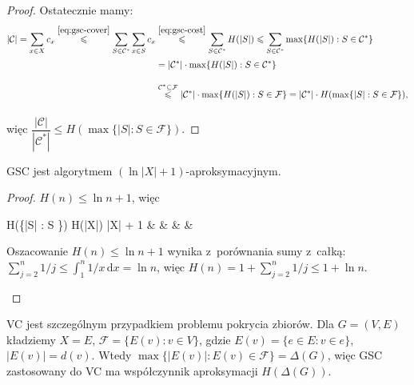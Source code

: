 \begin{obowiazkowy}
\begin{proof}
		Ostatecznie mamy:
		\begin{align*}
			|\mathcal{C}| = \sum_{x \in X} c_x \overset{\eqref{eq:gsc-cover}}{\leq} \sum_{S \in \mathcal{C}^*} \sum_{x \in S} c_x & \overset{\eqref{eq:gsc-cost}}{\leq} \sum_{S \in \mathcal{C}^*} H(|S|) \leq \sum_{S \in \mathcal{C}^*} \max\{H(|S|) : S \in \mathcal{C}^*\}                                                                            \\
			                                                                                                                      & = \vphantom{\sum_{S \in \mathcal{C}^*} H(|S|)} |\mathcal{C}^*| \cdot \max\{H(|S|) : S \in \mathcal{C}^*\}                                                                                                             \\
			                                                                                                                      & \overset{\mathcal{C}^* \subseteq \mathcal{F}}{\leq} \vphantom{\sum_{S \in \mathcal{C}^*} H(|S|)} |\mathcal{C}^*| \cdot \max\{H(|S|) : S \in \mathcal{F}\} = |\mathcal{C}^*| \cdot H(\max\{|S| : S \in \mathcal{F}\}),
		\end{align*}
		więc $\dfrac{|\mathcal{C}|}{|\mathcal{C}^*|} \leq H(\max\{|S| : S \in \mathcal{F}\})$.
	\end{proof}
\end{obowiazkowy}

\begin{obowiazkowy}
	\begin{conclusion}
		GSC jest algorytmem $(\ln|X| + 1)$-aproksymacyjnym.
	\end{conclusion}
	\begin{proof}
		$H(n) \leq \ln n + 1$, więc
		\begin{flalign*}
			H(\max\{|S| : S \in {}\}) \leq H(|X|) \leq \ln|X| + 1 &  &  &  & \tag*{\qedhere}
		\end{flalign*}
		\begin{dygresja}
			Oszacowanie $H(n) \leq \ln n + 1$ wynika z~porównania sumy z~całką: $\sum_{j = 2}^{n} 1/j \leq \int_{1}^{n} 1/x \, \mathrm{d}x = \ln n$, więc $H(n) = 1 + \sum_{j = 2}^{n} 1/j \leq 1 + \ln n$.
		\end{dygresja}
	\end{proof}
\end{obowiazkowy}

VC jest szczególnym przypadkiem problemu pokrycia zbiorów. Dla $G = (V, E)$ kładziemy $X = E$, $\mathcal{F} = \{E(v) : v \in V\}$, gdzie $E(v) = \{e \in E : v \in e\}$, $|E(v)| = d(v)$. Wtedy $\max\{|E(v)| : E(v) \in \mathcal{F}\} = \Delta(G)$, więc GSC zastosowany do VC ma współczynnik aproksymacji $H(\Delta(G))$.

